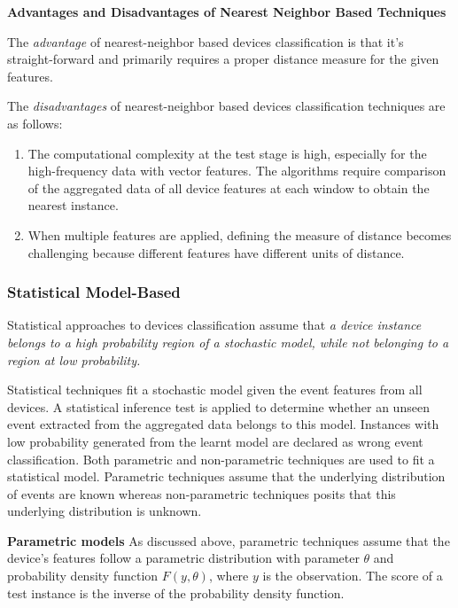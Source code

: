 \textbf{Advantages and Disadvantages of Nearest Neighbor Based Techniques}

The \textit{advantage} of nearest-neighbor based devices classification is 
that it's straight-forward and primarily requires a proper distance measure for the given features. 

The \textit{disadvantages} of nearest-neighbor based devices classification techniques are as follows:
\begin{enumerate}
\item The computational complexity at the test stage is high, 
especially for the high-frequency data with vector features. 
The algorithms require comparison of the aggregated data of all device features at each window to obtain the nearest instance. 
\item When multiple features are applied, defining the measure of distance becomes challenging because different features have different units of distance.
\end{enumerate}

\subsubsection{Statistical Model-Based}
Statistical approaches to devices classification assume that \textit{a device instance belongs to a high probability region of 
a stochastic model, while not belonging to a region at low probability.}

Statistical techniques fit a stochastic model given the event features from all devices. 
A statistical inference test is applied to determine whether an 
unseen event extracted from the aggregated data belongs to this model. 
Instances with low probability generated from the learnt model 
are declared as wrong event classification. 
Both parametric and non-parametric techniques are used to fit a statistical model. 
Parametric techniques assume that the underlying distribution of 
events are known whereas non-parametric techniques posits that this 
underlying distribution is unknown. 


\textbf{Parametric models}
As discussed above, parametric techniques assume that 
the device's features follow a parametric distribution 
with parameter $\theta$ and probability density function $F(y,\theta)$, 
where $y$ is the observation. 
The score of a test instance is the inverse of the probability density function. 

